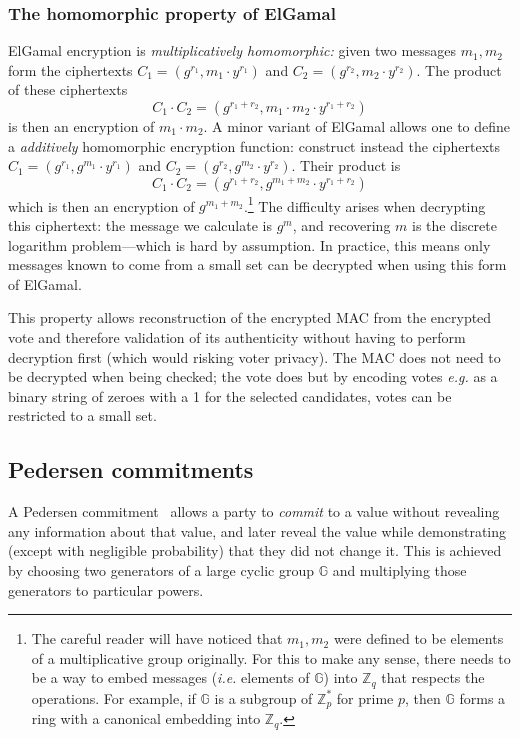 \documentclass[12pt,a4paper]{article}
\theoremstyle{definition}
\newcommand{\ie}{\textit{i.e. }}
\newcommand{\eg}{\textit{e.g. }}
\begin{document}
\subsubsection{The homomorphic property of ElGamal}
ElGamal encryption is \textit{multiplicatively homomorphic:} given two messages $m_1, m_2$ form the ciphertexts $C_1 = (g^{r_1}, m_1\cdot y^{r_1})$ and $C_2 = (g^{r_2}, m_2\cdot y^{r_2})$. The product of these ciphertexts
$$C_1\cdot C_2 = (g^{r_1+r_2}, m_1\cdot m_2\cdot y^{r_1+r_2})$$
is then an encryption of $m_1\cdot m_2$. A minor variant of ElGamal allows one to define a \textit{additively} homomorphic encryption function: construct instead the ciphertexts $C_1 = (g^{r_1}, g^{m_1}\cdot y^{r_1})$ and $C_2 = (g^{r_2}, g^{m_2}\cdot y^{r_2})$. Their product is
$$C_1\cdot C_2 = (g^{r_1+r_2}, g^{m_1 + m_2}\cdot y^{r_1+r_2})$$
which is then an encryption of $g^{m_1 + m_2}$.\footnote{The careful reader will have noticed that $m_1, m_2$ were defined to be elements of a multiplicative group originally. For this to make any sense, there needs to be a way to embed messages (\ie elements of $\mathbb{G}$) into $\mathbb{Z}_q$ that respects the operations. For example, if $\mathbb{G}$ is a subgroup of $\mathbb{Z}^*_p$ for prime $p$, then $\mathbb{G}$ forms a ring with a canonical embedding into $\mathbb{Z}_q$.} The difficulty arises when decrypting this ciphertext: the message we calculate is $g^m$, and recovering $m$ is the discrete logarithm problem---which is hard by assumption. In practice, this means only messages known to come from a small set can be decrypted when using this form of ElGamal.

This property allows reconstruction of the encrypted MAC from the encrypted vote and therefore validation of its authenticity without having to perform decryption first (which would risking voter privacy). The MAC does not need to be decrypted when being checked; the vote does but by encoding votes \eg as a binary string of zeroes with a 1 for the selected candidates, votes can be restricted to a small set.

\subsection{Pedersen commitments}
A Pedersen commitment~\cite{pedersen1991non} allows a party to \textit{commit} to a value without revealing any information about that value, and later reveal the value while demonstrating (except with negligible probability) that they did not change it. This is achieved by choosing two generators of a large cyclic group $\mathbb{G}$ and multiplying those generators to particular powers.
\end{document}
